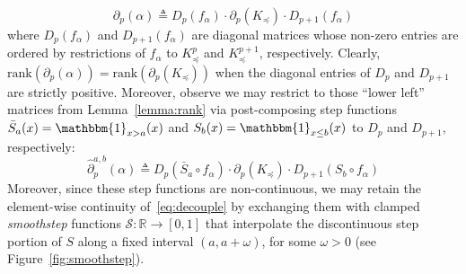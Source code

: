 \documentclass[10pt]{article}
\numberwithin{equation}{section}
\newcommand{\+}{%
	\raisebox{0.18ex}{\scaleobj{0.55}{+}}
}
\theoremstyle{definition}
\theoremstyle{definition}
\begin{document}
	\begin{equation}\label{eq:decouple}
		\partial_p(\alpha) \triangleq D_p(f_\alpha) \cdot \partial_p(K_\preceq) \cdot D_{p+1}(f_\alpha) 
	\end{equation}
	where $D_p(f_\alpha)$ and  $D_{p+1}(f_\alpha)$ are diagonal matrices whose non-zero entries are ordered by restrictions of $f_\alpha$ to $K_\preceq^p$ and $K_\preceq^{p+1}$, respectively.
Clearly, $\mathrm{rank}(\partial_p(\alpha)) = \mathrm{rank}(\partial_p(K_\preceq))$ when the diagonal entries of $D_p$ and $D_{p+1}$ are strictly positive. Moreover, observe we may restrict to those ``lower left'' matrices from Lemma~\ref{lemma:rank} via post-composing step functions $\bar{S}_a(x) = \mathbbm{1}_{x > a}(x)$ and $S_b(x) = \mathbbm{1}_{x \leq b}(x)$ to $D_p$ and $D_{p+1}$, respectively:
\begin{equation}\label{eq:rank_equiv_param}
	 \hat{\partial}_p^{a,b}(\alpha) \triangleq D_p(\bar{S}_a \circ f_\alpha) \cdot \partial_p(K_\preceq) \cdot D_{p+1}(S_b \circ f_\alpha) 
	\end{equation}
Moreover, since these step functions are non-continuous, we may retain the element-wise continuity of~\eqref{eq:decouple} by exchanging them with clamped \emph{smoothstep} functions $\mathcal{S}: \mathbb{R} \to [0, 1]$ that interpolate the discontinuous step portion of $S$ along a fixed interval $(a,a+\omega)$, for some $\omega > 0$ (see Figure~\ref{fig:smoothstep}).
\end{document}
